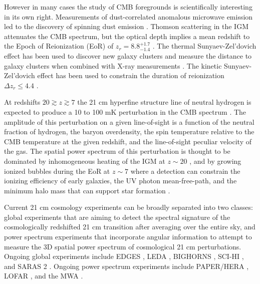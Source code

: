 \documentclass[twocolumn]{aastex61}
\begin{document}
However in many cases the study of CMB foregrounds is scientifically interesting in its own right.
Measurements of dust-correlated anomalous microwave emission \citep{1997ApJ...486L..23L} led to the
discovery of spinning dust emission \citep{1998ApJ...508..157D}. Thomson scattering in the IGM
attenuates the CMB spectrum, but the optical depth implies a mean redshift to the Epoch of
Reionization (EoR) of $z_r = 8.8^{+1.7}_{-1.4}$ \citep{2016A&A...594A..13P}.  The thermal
Sunyaev-Zel'dovich effect \citep{1970CoASP...2...66S, 1972CoASP...4..173S} has been used to discover
new galaxy clusters \citep{2010ApJ...722.1180V} and measure the distance to galaxy clusters when
combined with X-ray measurements \citep{2006ApJ...647...25B}. The kinetic Sunyaev-Zel'dovich effect
has been used to constrain the duration of reionization $\Delta z_r \le 4.4$
\citep{2012ApJ...756...65Z}.

At redshifts $20 \gtrsim z \gtrsim 7$ the 21 cm hyperfine structure line of neutral hydrogen is
expected to produce a 10 to 100 mK perturbation in the CMB spectrum \citep{2006PhR...433..181F,
2012RPPh...75h6901P}. The amplitude of this perturbation on a given line-of-sight is a function of
the neutral fraction of hydrogen, the baryon overdensity, the spin temperature relative to the CMB
temperature at the given redshift, and the line-of-sight peculiar velocity of the gas.  The spatial
power spectrum of this perturbation is thought to be dominated by inhomogeneous heating of the IGM
at $z\sim 20$ \citep{2014MNRAS.437L..36F}, and by growing ionized bubbles during the EoR at $z\sim
7$ where a detection can constrain the ionizing efficiency of early galaxies, the UV photon
mean-free-path, and the minimum halo mass that can support star formation
\citep{2015MNRAS.449.4246G}.

Current 21 cm cosmology experiments can be broadly separated into two classes: global experiments
that are aiming to detect the spectral signature of the cosmologically redshifted 21 cm transition
after averaging over the entire sky, and power spectrum experiments that incorporate angular
information to attempt to measure the 3D spatial power spectrum of cosmological 21 cm perturbations.
Ongoing global experiments include EDGES \citep{2010Natur.468..796B, 2017ApJ...835...49M}, LEDA
\citep{todo_price_2017}, BIGHORNS \citep{2015PASA...32....4S}, SCI-HI \citep{2014ApJ...782L...9V},
and SARAS 2 \citep{2017arXiv170306647S}.  Ongoing power spectrum experiments include PAPER/HERA
\citep{2015ApJ...809...61A, 2016arXiv160607473D}, LOFAR \citep{2017ApJ...838...65P}, and the MWA
\citep{2016ApJ...833..102B}.
\end{document}
